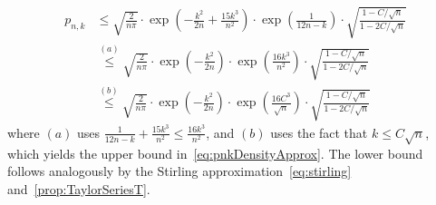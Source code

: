 \begin{align}
    p_{n,k} &\le \sqrt{\frac{2}{n\pi}} \cdot \exp\left(-\frac{k^2}{2n}+\frac{15k^3}{n^2}\right)\cdot \exp\left(\frac{1}{12n-k}\right)\cdot\sqrt{\frac{1-C/\sqrt{n}}{1-2C/\sqrt{n}}} \nonumber\\
    &\stackrel{(a)}{\le} \sqrt{\frac{2}{n\pi}} \cdot \exp\left(-\frac{k^2}{2n}\right)\cdot \exp\left(\frac{16k^3}{n^2}\right)\cdot\sqrt{\frac{1-C/\sqrt{n}}{1-2C/\sqrt{n}}} \nonumber\\
    &\stackrel{(b)}{\le}  \sqrt{\frac{2}{n\pi}} \cdot \exp\left(-\frac{k^2}{2n}\right)\cdot \exp\left(\frac{16C^3}{\sqrt{n}}\right)\cdot\sqrt{\frac{1-C/\sqrt{n}}{1-2C/\sqrt{n}}} \label{eq:pnkAsympUB}
\end{align}
where $(a)$ uses $\frac{1}{12n-k}+\frac{15k^3}{n^2} \le \frac{16k^3}{n^2}$, and $(b)$ uses the fact that $k \le C\sqrt{n}$, which yields the upper bound in~\cref{eq:pnkDensityApprox}. The lower bound follows analogously by the Stirling approximation~\cref{eq:stirling} and~\cref{prop:TaylorSeriesT}.





